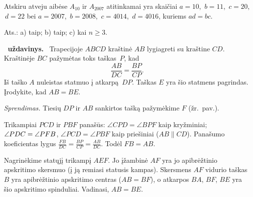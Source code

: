 \documentclass[11pt,a4paper]{article}
\newcommand{\hm}[1]{\nobreak\hspace{0pt}#1\nobreak\hspace{0pt}}
\newcounter{uzdavinys}
\newenvironment{uzdavinys}
  {\refstepcounter{uzdavinys}\par\medskip\noindent\textbf{\theuzdavinys\ uždavinys.}\ }
  {\par\medskip}
\begin{document}
Atskiru atveju aibėse $A_{10}$ ir $A_{2007}$ atitinkamai yra skaičiai $a=10$, \,$b=11$, \,$c=20$, \,$d=22$ bei $a=2007$, \,$b=2008$, \,$c=4014$, \,$d=4016$, kuriems $ad=bc$.

\begin{flushright}
Ats.: a) taip; b) taip; c) kai $n\geq3$.
\end{flushright}
 \vspace{0,6cm}  

\begin{uzdavinys}
Trapecijoje $ABCD$ kraštinė $AB$ lygiagreti su kraštine $CD$. Kraštinėje $BC$ pažymėtas toks taškas~$P$, kad $$\frac{AB}{DC}=\frac{BP}{CP}.$$ Iš taško $A$ nuleistas statmuo į atkarpą~$DP$. Taškas $E$ yra šio statmens pagrindas. Įrodykite, kad $AB=BE$.
\end{uzdavinys}

\textit{Sprendimas.} Tiesių $DP$ ir $AB$ sankirtos tašką pažymėkime $F$ (žr.~pav.).\vspace{1pt} 

\begin{center}
\end{center}

Trikampiai $PCD$ ir $PBF$ panašūs: $\angle CPD=\angle BPF$ kaip kryžminiai; $\angle PDC\hm=\angle PFB$, $\angle PCD=\angle PBF$ kaip priešiniai ($AB\parallel CD$). Panašumo koeficientas lygus $\frac{FB}{DC}=\frac{BP}{CP}=\frac{AB}{DC}$. Todėl $FB=AB$.

Nagrinėkime statųjį trikampį $AEF$. Jo įžambinė $AF$ yra jo apibrėžtinio apskritimo skersmuo (į ją remiasi statusis kampas). Skersmens $AF$ vidurio taškas $B$ yra apibrėžtinio apskritimo centras ($AB=BF$), o atkarpos $BA$, $BF$, $BE$ yra šio apskritimo spinduliai. Vadinasi, $AB=BE$.
 \vspace{0,3cm}
\end{document}
